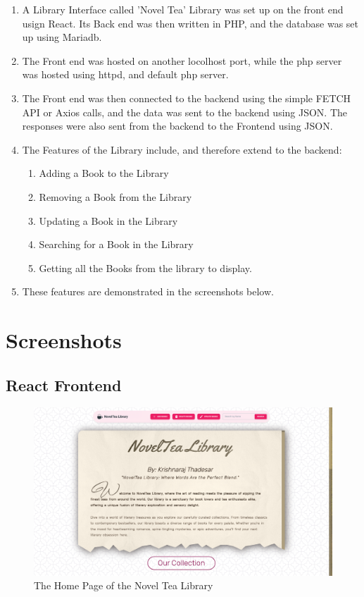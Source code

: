 \documentclass[11pt]{article}
\begin{document}
\begin{enumerate}
    \item A Library Interface called 'Novel Tea' Library was set up on the front end usign React. Its Back end was then written in PHP, and the database was set up using Mariadb.
    \item The Front end was hosted on another locolhost port, while the php server was hosted using httpd, and default php server.
    \item The Front end was then connected to the backend using the simple FETCH API or Axios calls, and the data was sent to the backend using JSON. The responses were also sent from the backend to the Frontend using JSON.
    \item The Features of the Library include, and therefore extend to the backend:
          \begin{enumerate}
              \item Adding a Book to the Library
              \item Removing a Book from the Library
              \item Updating a Book in the Library
              \item Searching for a Book in the Library
              \item Getting all the Books from the library to display.
          \end{enumerate}
    \item These features are demonstrated in the screenshots below.
\end{enumerate}

\section{Screenshots}

\subsection{React Frontend}
\begin{figure}[H]
    \centering
    \includegraphics[width=.95\textwidth]{screenshots/home.png}
    \caption{The Home Page of the Novel Tea Library}
\end{figure}
\end{document}
